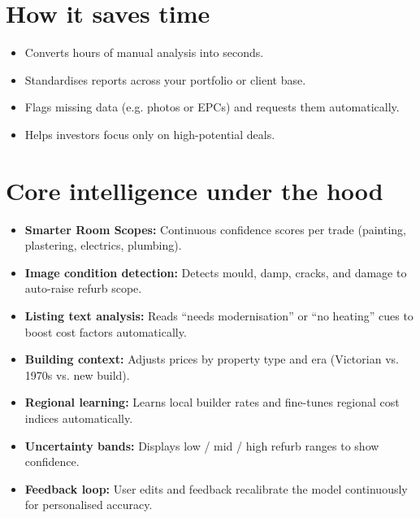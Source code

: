 \documentclass[11pt,a4paper]{article}
\begin{document}
\section*{How it saves time}
\begin{itemize}
  \item Converts hours of manual analysis into seconds.
  \item Standardises reports across your portfolio or client base.
  \item Flags missing data (e.g. photos or EPCs) and requests them automatically.
  \item Helps investors focus only on high-potential deals.
\end{itemize}

\section*{Core intelligence under the hood}
\begin{itemize}
  \item \textbf{Smarter Room Scopes:} Continuous confidence scores per trade (painting, plastering, electrics, plumbing).
  \item \textbf{Image condition detection:} Detects mould, damp, cracks, and damage to auto-raise refurb scope.
  \item \textbf{Listing text analysis:} Reads “needs modernisation” or “no heating” cues to boost cost factors automatically.
  \item \textbf{Building context:} Adjusts prices by property type and era (Victorian vs. 1970s vs. new build).
  \item \textbf{Regional learning:} Learns local builder rates and fine-tunes regional cost indices automatically.
  \item \textbf{Uncertainty bands:} Displays low / mid / high refurb ranges to show confidence.
  \item \textbf{Feedback loop:} User edits and feedback recalibrate the model continuously for personalised accuracy.
\end{itemize}
\end{document}

